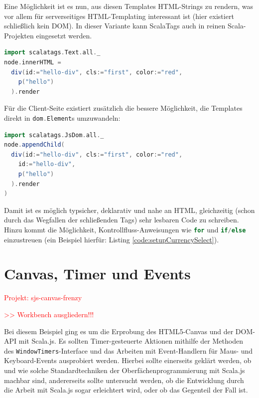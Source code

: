 \documentclass[a4paper, 12pt, hidelinks, listof=totoc, listoftables=totoc, bibliography=totoc]{scrreprt}
\newcommand{\code}[1]{\lstinline[language=Scala, style=inline]|#1|}
\newcommand{\scala}[1]{\lstinline[language=Scala, style=inline]|#1|}
\newcommand{\TODO}[1]{\textcolor{red}{#1}\newline}
\begin{document}
Eine Möglichkeit ist es nun, aus diesen Templates \ac{HTML}-Strings zu rendern, was vor allem für serverseitiges \ac{HTML}-Templating interessant ist (hier existiert schließlich kein \ac{DOM}). In dieser Variante kann ScalaTags auch in reinen Scala-Projekten eingesetzt werden.

\begin{lstlisting}[language=Scala, caption={HTML-Generierung mit ScalaTags und Strings.}]
import scalatags.Text.all._
node.innerHTML =
  div(id:="hello-div", cls:="first", color:="red",
    p("hello")
  ).render
\end{lstlisting}

Für die Client-Seite existiert zusätzlich die bessere Möglichkeit, die Templates direkt in \scala{dom.Element}s umzuwandeln:

\begin{lstlisting}[language=Scala, caption={HTML-Generierung mit ScalaTags und Nodes.}]
import scalatags.JsDom.all._
node.appendChild(
  div(id:="hello-div", cls:="first", color:="red",
    id:="hello-div",
    p("hello")
  ).render
)
\end{lstlisting}

Damit ist es möglich typsicher, deklarativ und nahe an \ac{HTML}, gleichzeitig (schon durch das Wegfallen der schließenden Tags) sehr lesbaren Code zu schreiben. Hinzu kommt die Möglichkeit, Kontrollfluss-Anweisungen wie \scala{for} und \scala{if/else} einzustreuen (ein Beispiel hierfür: Listing \ref{code:setupCurrencySelect}).



\section{Canvas, Timer und Events}

\TODO{Projekt: sjs-canvas-frenzy}

\TODO{>> Workbench ausgliedern!!!}


Bei diesem Beispiel ging es um die Erprobung des HTML5-Canvas und der \ac{DOM}-\ac{API} mit Scala.js. Es sollten Timer-gesteuerte Aktionen mithilfe der Methoden des \code{WindowTimers}-Interface und das Arbeiten mit Event-Handlern für Maus- und Keyboard-Events ausprobiert werden. Hierbei sollte einerseits geklärt werden, ob und wie solche Standardtechniken der Oberfächenprogrammierung mit Scala.js machbar sind, andererseits sollte untersucht werden, ob die Entwicklung durch die Arbeit mit Scala.js sogar erleichtert wird, oder ob das Gegenteil der Fall ist.
\end{document}
